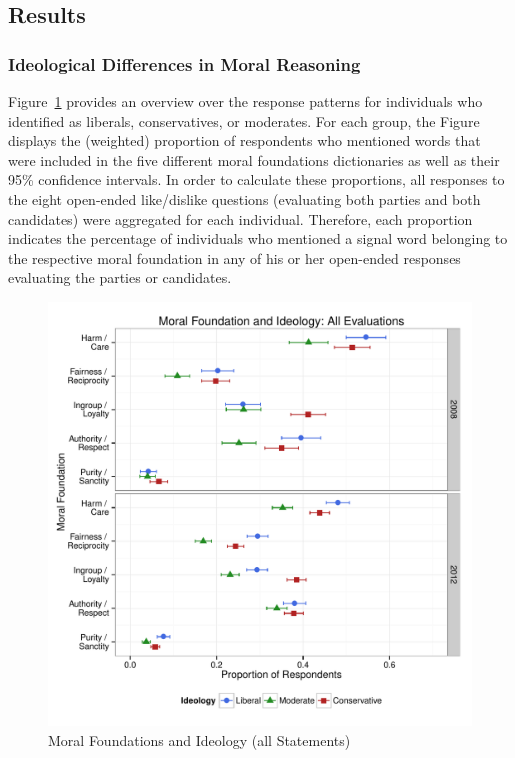 \documentclass[12pt]{article}
\begin{document}
\subsection{Results}

\subsubsection{Ideological Differences in Moral Reasoning}

Figure~\ref{fig:mft_ideol} provides an overview over the response patterns for individuals who identified as liberals, conservatives, or moderates. For each group, the Figure displays the (weighted) proportion of respondents who mentioned words that were included in the five different moral foundations dictionaries as well as their 95\% confidence intervals. In order to calculate these proportions, all responses to the eight open-ended like/dislike questions (evaluating both parties and both candidates) were aggregated for each individual. Therefore, each proportion indicates the percentage of individuals who mentioned a signal word belonging to the respective moral foundation in any of his or her open-ended responses evaluating the parties or candidates.

\begin{figure}[ht]\centering
\includegraphics[scale=.5]{../calc/fig/p1_mft_ideol.pdf}
\caption{Moral Foundations and Ideology (all Statements)}\label{fig:mft_ideol}
\end{figure}
\end{document}
